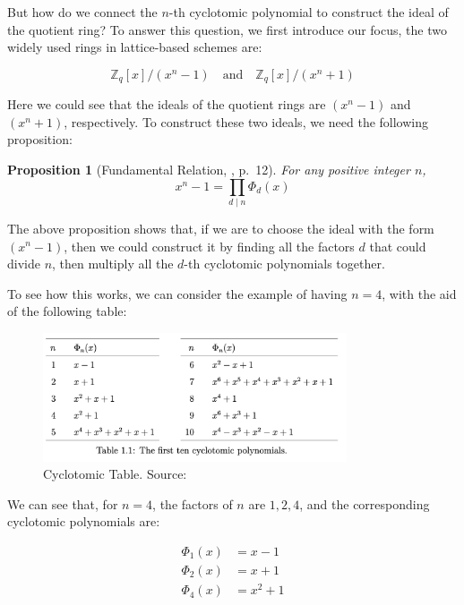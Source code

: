 \documentclass[12pt]{article}
\newtheorem{proposition}{Proposition}[section]
\begin{document}
But how do we connect the $n$-th cyclotomic polynomial to construct the ideal of the quotient ring?
To answer this question, we first introduce our focus, 
the two widely used rings in lattice-based schemes are:

\begin{equation*}
    \mathbb{Z}_q[x] / (x^n - 1) \quad \text{and} \quad \mathbb{Z}_q[x] / (x^n + 1)
\end{equation*}
\cite[p.~3]{survey}

Here we could see that the ideals of the quotient rings are $(x^n - 1)$ and $(x^n + 1)$, respectively.
To construct these two ideals, we need the following proposition:

\begin{proposition}[Fundamental Relation, \cite{cyclotomic}, p.~12]
    For any positive integer $n$, 
    \begin{equation*}
        x^n - 1 = \prod_{d \mid n} \Phi_d(x)
    \end{equation*}
\end{proposition}

The above proposition shows that, if we are to choose the ideal with the form $(x^n - 1)$, 
then we could construct it by finding all the factors $d$ that could divide $n$, 
then multiply all the $d$-th cyclotomic polynomials together.

To see how this works, we can consider the example of having $n = 4$, 
with the aid of the following table:

\begin{figure}[h]
    \centering
    \includegraphics[width=0.8\textwidth]{Final_img/cyclotomic_table.png}
    \caption{Cyclotomic Table. Source: \cite[p.~11]{cyclotomic}}
    \label{fig:cyclotomic_table}
\end{figure}

We can see that, for $n = 4$, 
the factors of $n$ are $1, 2, 4$, 
and the corresponding cyclotomic polynomials are:

\begin{align*}
    \Phi_1(x) &= x - 1 \\
    \Phi_2(x) &= x + 1 \\
    \Phi_4(x) &= x^2 + 1
\end{align*}
\end{document}
